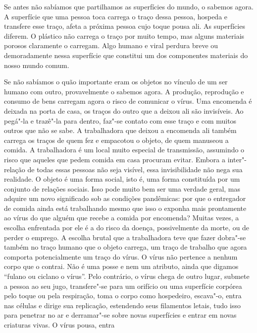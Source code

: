 \begin{multicols}{2}
\baselineskip
\lineskip=1pt
\noindent{}Se antes não sabíamos que partilhamos as superfícies do mundo, o sabemos
agora. A superfície que uma pessoa toca carrega o traço dessa pessoa,
hospeda e transfere esse traço, afeta a próxima pessoa cujo toque pousa
ali. As superfícies diferem. O plástico não carrega o traço por muito
tempo, mas alguns materiais porosos claramente o carregam. Algo humano e
viral perdura breve ou demoradamente nessa superfície que constitui um
dos componentes materiais do nosso mundo comum.

Se não sabíamos o quão importante eram os objetos no vínculo de um ser
humano com outro, provavelmente o sabemos agora. A produção, reprodução
e consumo de bens carregam agora o risco de comunicar o vírus. Uma
encomenda é deixada na porta de casa, os traços do outro que a deixou
ali são invisíveis. Ao pegá"-la e trazê"-la para dentro, faz"-se contato
com esse traço e com muitos outros que não se sabe. A trabalhadora que
deixou a encomenda ali também carrega os traços de quem fez e empacotou
o objeto, de quem manuseou a comida. A trabalhadora é um local muito
especial de transmissão, assumindo o risco que aqueles que pedem comida
em casa procuram evitar. Embora a inter"-relação de todas essas pessoas
não seja visível, essa invisibilidade não nega sua realidade.
O objeto é
uma forma social, isto é, uma forma constituída por um conjunto de
relações sociais. Isso pode muito bem ser uma verdade geral, mas adquire
um novo significado sob as condições pandêmicas: por que o entregador de
comida ainda está trabalhando mesmo que isso o exponha mais prontamente
ao vírus do que alguém que recebe a comida por encomenda? Muitas vezes,
a escolha enfrentada por ele é a do risco da doença, possivelmente da
morte, ou de perder o emprego. A escolha brutal que a trabalhadora teve
que fazer dobra"-se também no traço humano que o objeto carrega, um traço
de trabalho que agora comporta potencialmente um traço do vírus. O vírus
não pertence a nenhum corpo que o contrai. Não é uma posse e nem um
atributo, ainda que digamos ``fulano ou ciclano {} o vírus''.
Pelo contrário, o vírus chega de outro lugar, submete a pessoa ao seu
jugo, transfere"-se para um orifício ou uma superfície corpórea pelo
toque ou pela respiração, toma o corpo como hospedeiro, escava"-o, entra
nas células e dirige sua replicação, estendendo seus filamentos letais,
tudo isso para penetrar no ar e derramar"-se sobre novas superfícies e
entrar em novas criaturas vivas. O vírus pousa, entra

\end{multicols}
